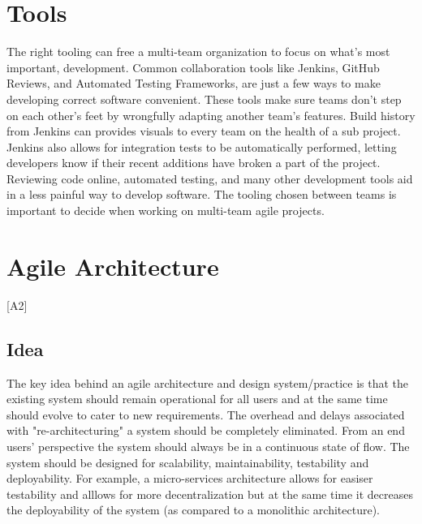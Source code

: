 \documentclass[sigplan,screen]{acmart}
\begin{document}
\section{Tools}
The right tooling can free a multi-team organization to focus on what's most important, development.
Common collaboration tools like Jenkins, GitHub Reviews, and Automated Testing Frameworks, are just a few ways to make developing correct software convenient.
These tools make sure teams don't step on each other's feet by wrongfully adapting another team's features.
Build history from Jenkins can provides visuals to every team on the health of a sub project.
Jenkins also allows for integration tests to be automatically performed, letting developers know if their recent additions have broken a part of the project.
Reviewing code online, automated testing, and many other development tools aid in a less painful way to develop software.
The tooling chosen between teams is important to decide when working on multi-team agile projects.

\section{Agile Architecture} [A2]
\subsection{Idea}
The key idea behind an agile architecture and design system/practice is that the existing system should remain operational for all users and at the same time should evolve to cater to new requirements.
The overhead and delays associated with "re-architecturing" a system should be completely eliminated. From an end users' perspective the system should always be in a continuous state of flow.
The system should be designed for scalability, maintainability, testability and deployability. For example, a micro-services architecture allows for easiser testability and alllows for more decentralization but at the same time it decreases the deployability of the system (as compared to a monolithic architecture).
\end{document}
